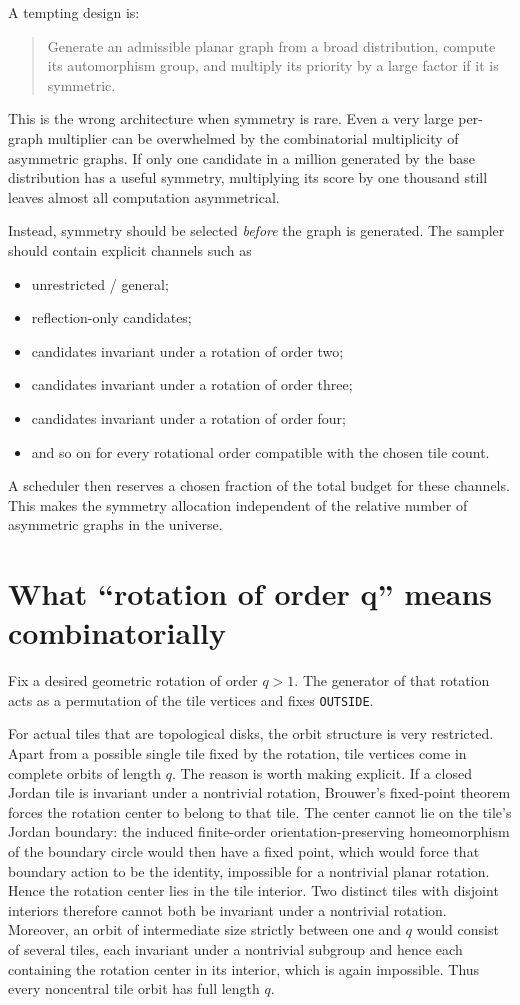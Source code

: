 \documentclass[11pt]{article}
\newcommand{\OUT}{\texttt{OUTSIDE}}
\begin{document}
A tempting design is:
\begin{quote}
Generate an admissible planar graph from a broad distribution, compute its automorphism group, and multiply its priority by a large factor if it is symmetric.
\end{quote}

This is the wrong architecture when symmetry is rare. Even a very large per-graph multiplier can be overwhelmed by the combinatorial multiplicity of asymmetric graphs. If only one candidate in a million generated by the base distribution has a useful symmetry, multiplying its score by one thousand still leaves almost all computation asymmetrical.

Instead, symmetry should be selected \emph{before} the graph is generated. The sampler should contain explicit channels such as
\begin{itemize}
  \item unrestricted / general;
  \item reflection-only candidates;
  \item candidates invariant under a rotation of order two;
  \item candidates invariant under a rotation of order three;
  \item candidates invariant under a rotation of order four;
  \item and so on for every rotational order compatible with the chosen tile count.
\end{itemize}

A scheduler then reserves a chosen fraction of the total budget for these channels. This makes the symmetry allocation independent of the relative number of asymmetric graphs in the universe.

\section{What ``rotation of order q'' means combinatorially}

Fix a desired geometric rotation of order \(q>1\). The generator of that rotation acts as a permutation of the tile vertices and fixes \OUT.

For actual tiles that are topological disks, the orbit structure is very restricted. Apart from a possible single tile fixed by the rotation, tile vertices come in complete orbits of length \(q\). The reason is worth making explicit. If a closed Jordan tile is invariant under a nontrivial rotation, Brouwer's fixed-point theorem forces the rotation center to belong to that tile. The center cannot lie on the tile's Jordan boundary: the induced finite-order orientation-preserving homeomorphism of the boundary circle would then have a fixed point, which would force that boundary action to be the identity, impossible for a nontrivial planar rotation. Hence the rotation center lies in the tile interior. Two distinct tiles with disjoint interiors therefore cannot both be invariant under a nontrivial rotation. Moreover, an orbit of intermediate size strictly between one and \(q\) would consist of several tiles, each invariant under a nontrivial subgroup and hence each containing the rotation center in its interior, which is again impossible. Thus every noncentral tile orbit has full length \(q\).
\end{document}
